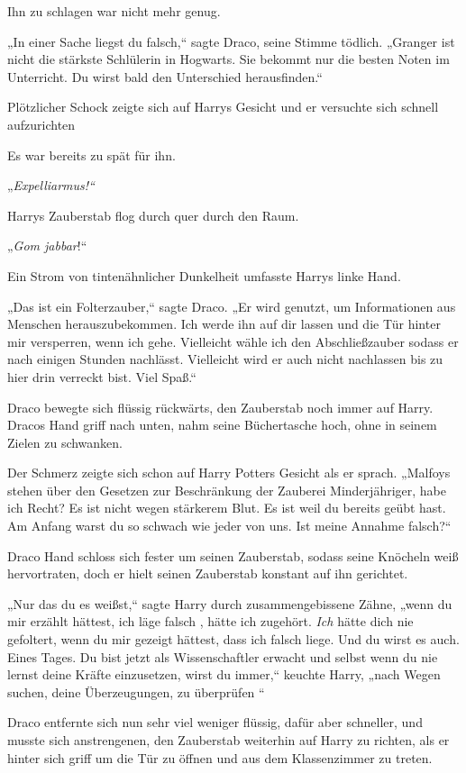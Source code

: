 {Ihn zu schlagen war nicht mehr genug.

„In einer Sache liegst du falsch,“ sagte Draco, seine Stimme tödlich. „Granger ist nicht die stärkste Schlülerin in Hogwarts. Sie bekommt nur die besten Noten im Unterricht. Du wirst bald den Unterschied herausfinden.“

Plötzlicher Schock zeigte sich auf Harrys Gesicht und er versuchte sich schnell aufzurichten \later

Es war bereits zu spät für ihn.

„\emph{Expelliarmus!“}

Harrys Zauberstab flog durch quer durch den Raum.

„\emph{Gom jabbar}!“

Ein Strom von tintenähnlicher Dunkelheit umfasste Harrys linke Hand.

„Das ist ein Folterzauber,“ sagte Draco. „Er wird genutzt, um Informationen aus Menschen herauszubekommen. Ich werde ihn auf dir lassen und die Tür hinter mir versperren, wenn ich gehe. Vielleicht wähle ich den Abschließzauber sodass er nach einigen Stunden nachlässt. Vielleicht wird er auch nicht nachlassen bis zu hier drin verreckt bist. Viel Spaß.“

Draco bewegte sich flüssig rückwärts, den Zauberstab noch immer auf Harry. Dracos Hand griff nach unten, nahm seine Büchertasche hoch, ohne in seinem Zielen zu schwanken.

Der Schmerz zeigte sich schon auf Harry Potters Gesicht als er sprach. „Malfoys stehen über den Gesetzen zur Beschränkung der Zauberei Minderjähriger, habe ich Recht? Es ist nicht wegen stärkerem Blut. Es ist weil du bereits geübt hast. Am Anfang warst du so schwach wie jeder von uns. Ist meine Annahme falsch?“

Draco Hand schloss sich fester um seinen Zauberstab, sodass seine Knöcheln weiß hervortraten, doch er hielt seinen Zauberstab konstant auf ihn gerichtet.

„Nur das du es weißst,“ sagte Harry durch zusammengebissene Zähne, „wenn du mir erzählt hättest, ich läge falsch , hätte ich zugehört. \emph{Ich} hätte dich nie gefoltert, wenn du mir gezeigt hättest, dass ich falsch liege. Und du wirst es auch. Eines Tages. Du bist jetzt als Wissenschaftler erwacht und selbst wenn du nie lernst deine Kräfte einzusetzen, wirst du immer,“ keuchte Harry, „nach Wegen suchen, deine Überzeugungen, zu überprüfen \later“

Draco entfernte sich nun sehr viel weniger flüssig, dafür aber schneller, und musste sich anstrengenen, den Zauberstab weiterhin auf Harry zu richten, als er hinter sich griff um die Tür zu öffnen und aus dem Klassenzimmer zu treten.

}
